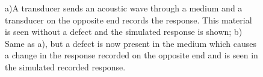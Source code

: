  \begin{figure}[ht!]
\begin{subfigmatrix}{2}
\end{subfigmatrix}

   \caption
   { \label{fig:detectChange}
   a)A transducer sends an acoustic wave through a medium and a transducer on the opposite end records the response. This material is seen without a defect and the simulated response is shown; b) Same as a), but a defect is now present in the medium which causes a change in the response recorded on the opposite end and is seen in the simulated recorded response.
 }
\end{figure}

